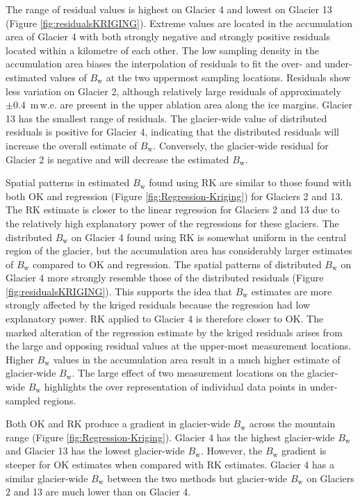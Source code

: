 \documentclass[onecolumn, letterpaper]{igs}
\begin{document}
The range of residual values is highest on Glacier 4 and lowest on Glacier 13 (Figure \ref{fig:residualsKRIGING}). Extreme values are located in the accumulation area of Glacier 4 with both strongly negative and strongly positive residuals located within a kilometre of each other. The low sampling density in the accumulation area biases the interpolation of residuals to fit the over- and under-estimated values of $B_\mathrm{w}$ at the two uppermost sampling locations. Residuals show less variation on Glacier 2, although relatively large residuals of approximately $\pm 0.4$ \,m\,w.e. are present in the upper ablation area along the ice margins. Glacier 13 has the smallest range of residuals. The glacier-wide value of distributed residuals is positive for Glacier 4, indicating that the distributed residuals will increase the overall estimate of $B_\mathrm{w}$. Conversely, the glacier-wide residual for Glacier 2 is negative and will decrease the estimated $B_\mathrm{w}$. 

Spatial patterns in estimated $B_\mathrm{w}$ found using RK are similar to those found with both OK and regression (Figure \ref{fig:Regression-Kriging}) for Glaciers 2 and 13. The RK estimate is closer to the linear regression for Glaciers 2 and 13 due to the relatively high explanatory power of the regressions for these glaciers. The distributed $B_\mathrm{w}$ on Glacier 4 found using RK is somewhat uniform in the central region of the glacier, but the accumulation area has considerably larger estimates of $B_\mathrm{w}$ compared to OK and regression. The spatial patterns of distributed $B_\mathrm{w}$ on Glacier 4 more strongly resemble those of the distributed residuals (Figure \ref{fig:residualsKRIGING}). This supports the idea that $B_\mathrm{w}$ estimates are more strongly affected by the kriged residuals because the regression had low explanatory power. RK applied to Glacier 4 is therefore closer to OK. The marked alteration of the regression estimate by the kriged residuals arises from the large and opposing residual values at the upper-most measurement locations. Higher $B_\mathrm{w}$ values in the accumulation area result in a much higher estimate of glacier-wide $B_\mathrm{w}$. The large effect of two measurement locations on the glacier-wide $B_\mathrm{w}$ highlights the over representation of individual data points in under-sampled regions.

Both OK and RK produce a gradient in glacier-wide $B_\mathrm{w}$ across the mountain range (Figure \ref{fig:Regression-Kriging}). Glacier 4 has the highest glacier-wide $B_\mathrm{w}$ and Glacier 13 has the lowest glacier-wide $B_\mathrm{w}$. However, the $B_\mathrm{w}$ gradient is steeper for OK estimates when compared with RK estimates. Glacier 4 has a similar glacier-wide $B_\mathrm{w}$ between the two methods but glacier-wide $B_\mathrm{w}$ on Glaciers 2 and 13 are much lower than on Glacier 4.  
\end{document}
